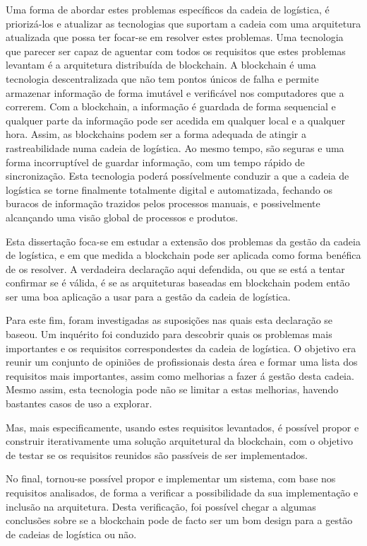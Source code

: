 Uma forma de abordar estes problemas específicos da cadeia de logística, é priorizá-los e atualizar as tecnologias que suportam a cadeia com uma arquitetura atualizada que possa ter focar-se em resolver estes problemas. Uma tecnologia que parecer ser capaz de aguentar com todos os requisitos que estes problemas levantam é a arquitetura distribuída de blockchain. A blockchain é uma tecnologia descentralizada que não tem pontos únicos de falha e permite armazenar informação de forma imutável e verificável nos computadores que a correrem. Com a blockchain, a informação é guardada de forma sequencial e qualquer parte da informação pode ser acedida em qualquer local e a qualquer hora. Assim, as blockchains podem ser a forma adequada de atingir a rastreabilidade numa cadeia de logística. Ao mesmo tempo, são seguras e uma forma incorruptível de guardar informação, com um tempo rápido de sincronização. Esta tecnologia poderá possívelmente conduzir a que a cadeia de logística se torne finalmente totalmente digital e automatizada, fechando os buracos de informação trazidos pelos processos manuais, e possivelmente alcançando uma visão global de processos e produtos.

Esta dissertação foca-se em estudar a extensão dos problemas da gestão da cadeia de logística, e em que medida a blockchain pode ser aplicada como forma benéfica de os resolver. A verdadeira declaração aqui defendida, ou que se está a tentar confirmar se é válida, é se as arquiteturas baseadas em blockchain podem então ser uma boa aplicação a usar para a gestão da cadeia de logística.

Para este fim, foram investigadas as suposições nas quais esta declaração se baseou. Um inquérito foi conduzido para descobrir quais os problemas mais importantes e os requisitos correspondestes da cadeia de logística. O objetivo era reunir um conjunto de opiniões de profissionais desta área e formar uma lista dos requisitos mais importantes, assim como melhorias a fazer á gestão desta cadeia. Mesmo assim, esta tecnologia pode não se limitar a estas melhorias, havendo bastantes casos de uso a explorar.

Mas, mais especificamente, usando estes requisitos levantados, é possível propor e construir iterativamente uma solução arquitetural da blockchain, com o objetivo de testar se os requisitos reunidos são passíveis de ser implementados. 

No final, tornou-se possível propor e implementar um sistema, com base nos requisitos analisados, de forma a verificar a possibilidade da sua implementação e inclusão na arquitetura. Desta verificação, foi possível chegar a algumas conclusões sobre se a blockchain pode de facto ser um bom design para a gestão de cadeias de logística ou não.

